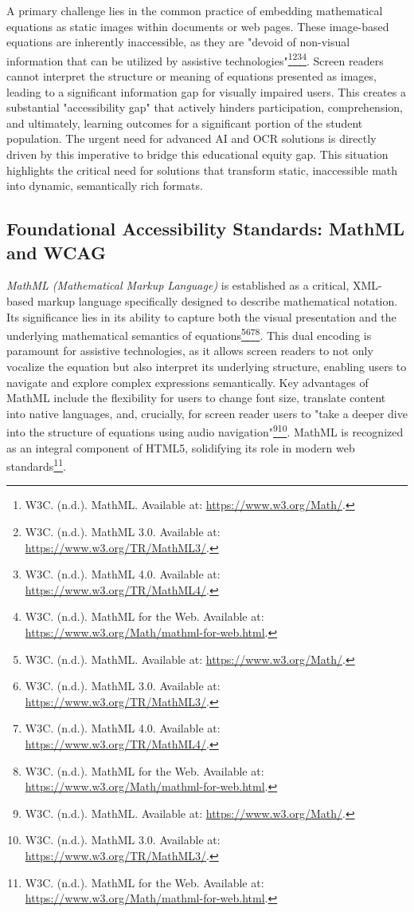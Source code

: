 A primary challenge lies in the common practice of embedding mathematical equations as static images within documents or web pages. These image-based equations are inherently inaccessible, as they are "devoid of non-visual information that can be utilized by assistive technologies"\footnote{W3C. (n.d.). MathML. Available at: \url{https://www.w3.org/Math/}.}\footnote{W3C. (n.d.). MathML 3.0. Available at: \url{https://www.w3.org/TR/MathML3/}.}\footnote{W3C. (n.d.). MathML 4.0. Available at: \url{https://www.w3.org/TR/MathML4/}.}\footnote{W3C. (n.d.). MathML for the Web. Available at: \url{https://www.w3.org/Math/mathml-for-web.html}.}. Screen readers cannot interpret the structure or meaning of equations presented as images, leading to a significant information gap for visually impaired users. This creates a substantial "accessibility gap" that actively hinders participation, comprehension, and ultimately, learning outcomes for a significant portion of the student population. The urgent need for advanced AI and OCR solutions is directly driven by this imperative to bridge this educational equity gap. This situation highlights the critical need for solutions that transform static, inaccessible math into dynamic, semantically rich formats.

\subsection{Foundational Accessibility Standards: MathML and WCAG}

\emph{MathML (Mathematical Markup Language)} is established as a critical, XML-based markup language specifically designed to describe mathematical notation. Its significance lies in its ability to capture both the visual presentation and the underlying mathematical semantics of equations\footnote{W3C. (n.d.). MathML. Available at: \url{https://www.w3.org/Math/}.}\footnote{W3C. (n.d.). MathML 3.0. Available at: \url{https://www.w3.org/TR/MathML3/}.}\footnote{W3C. (n.d.). MathML 4.0. Available at: \url{https://www.w3.org/TR/MathML4/}.}\footnote{W3C. (n.d.). MathML for the Web. Available at: \url{https://www.w3.org/Math/mathml-for-web.html}.}. This dual encoding is paramount for assistive technologies, as it allows screen readers to not only vocalize the equation but also interpret its underlying structure, enabling users to navigate and explore complex expressions semantically. Key advantages of MathML include the flexibility for users to change font size, translate content into native languages, and, crucially, for screen reader users to "take a deeper dive into the structure of equations using audio navigation"\footnote{W3C. (n.d.). MathML. Available at: \url{https://www.w3.org/Math/}.}\footnote{W3C. (n.d.). MathML 3.0. Available at: \url{https://www.w3.org/TR/MathML3/}.}. MathML is recognized as an integral component of HTML5, solidifying its role in modern web standards\footnote{W3C. (n.d.). MathML for the Web. Available at: \url{https://www.w3.org/Math/mathml-for-web.html}.}.

